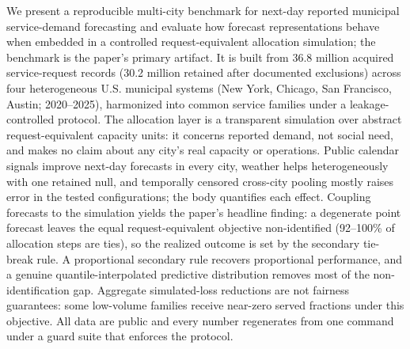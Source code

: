 We present a reproducible multi-city benchmark for next-day reported
municipal service-demand forecasting and evaluate how forecast
representations behave when embedded in a controlled request-equivalent
allocation simulation; the benchmark is the paper's primary artifact.
It is built from 36.8 million acquired service-request records (30.2
million retained after documented exclusions) across four heterogeneous
U.S. municipal systems (New York, Chicago, San Francisco, Austin;
2020--2025), harmonized into common service families under a
leakage-controlled protocol. The allocation layer is a transparent
simulation over abstract request-equivalent capacity units: it concerns
reported demand, not social need, and makes no claim about any city's
real capacity or operations. Public calendar signals improve next-day
forecasts in every city, weather helps heterogeneously with one
retained null, and temporally censored cross-city pooling mostly raises
error in the tested configurations; the body quantifies each effect. Coupling forecasts to the
simulation yields the paper's headline finding: a degenerate point
forecast leaves the equal request-equivalent objective non-identified
(92--100\% of allocation steps are ties), so the realized outcome is
set by the secondary tie-break rule. A proportional secondary rule
recovers proportional performance, and a genuine quantile-interpolated
predictive distribution removes most of the non-identification gap.
Aggregate simulated-loss reductions are not fairness guarantees: some
low-volume families receive near-zero served fractions under this
objective. All data are public and every number regenerates from one
command under a guard suite that enforces the protocol.
